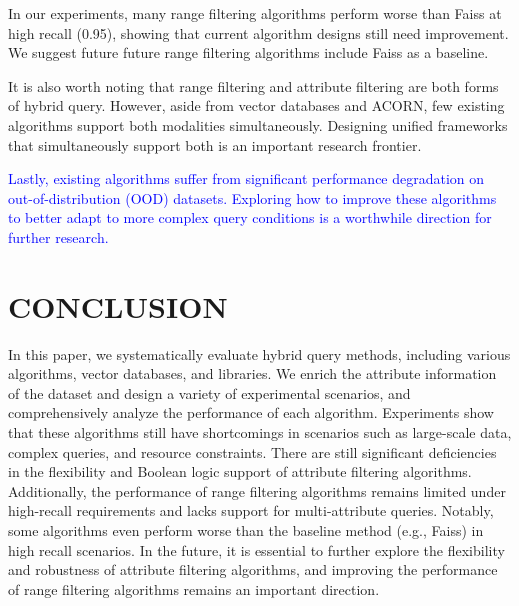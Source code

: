 \documentclass[sigconf, nonacm]{acmart}
\begin{document}
		In our experiments, many range filtering algorithms perform worse than Faiss at high recall (0.95), showing that current algorithm designs still need improvement. We suggest future future range filtering algorithms include Faiss as a baseline.
	
	
	It is also worth noting that range filtering and attribute filtering are both forms of hybrid query. However, aside from vector databases and ACORN, few existing algorithms support both modalities simultaneously. Designing unified frameworks that simultaneously support both is an important research frontier. 
	
	\textcolor{blue}{
	Lastly, existing algorithms suffer from significant performance degradation on out-of-distribution (OOD) datasets. Exploring how to improve these algorithms to better adapt to more complex query conditions is a worthwhile direction for further research.}
	
%	
	
	\section{CONCLUSION}
	In this paper, we systematically evaluate hybrid query methods, including various algorithms, vector databases, and libraries. We enrich the attribute information of the dataset and design a variety of experimental scenarios, and comprehensively analyze the performance of each algorithm. Experiments show that these algorithms still have shortcomings in scenarios such as large-scale data, complex queries, and resource constraints. There are still significant deficiencies in the flexibility and Boolean logic support of attribute filtering algorithms. Additionally, the performance of range filtering algorithms remains limited under high-recall requirements and lacks support for multi-attribute queries. Notably, some algorithms even perform worse than the baseline method (e.g., Faiss) in high recall scenarios.  In the future, it is essential to further explore the flexibility and robustness of attribute filtering algorithms, and improving the performance of range filtering algorithms remains an important direction.
%	
	
	
	
	\clearpage
	
	
	
\end{document}
